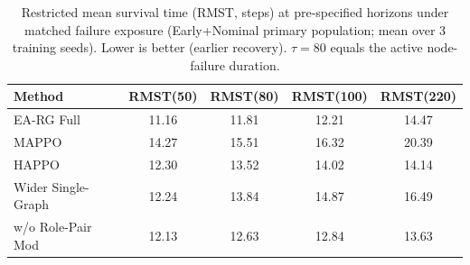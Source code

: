 \begin{table}[t]
\centering
\small
\caption{Restricted mean survival time (RMST, steps) at pre-specified horizons under matched failure exposure (Early+Nominal primary population; mean over 3 training seeds). Lower is better (earlier recovery). $\tau=80$ equals the active node-failure duration.}
\label{tab:rmst}
\begin{tabular}{lcccc}
\toprule
Method & RMST(50) & RMST(80) & RMST(100) & RMST(220) \\
\midrule
EA-RG Full & 11.16 & 11.81 & 12.21 & 14.47 \\
MAPPO & 14.27 & 15.51 & 16.32 & 20.39 \\
HAPPO & 12.30 & 13.52 & 14.02 & 14.14 \\
Wider Single-Graph & 12.24 & 13.84 & 14.87 & 16.49 \\
w/o Role-Pair Mod & 12.13 & 12.63 & 12.84 & 13.63 \\
\bottomrule
\end{tabular}
\end{table}